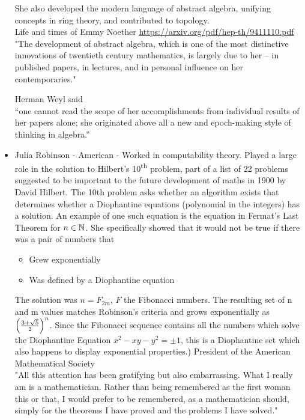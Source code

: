 \documentclass{article}
\begin{document}
\begin{itemize}
    She also developed the modern language of abstract algebra, unifying concepts in ring theory, and contributed to topology.  \\
    Life and times of Emmy Noether \url{https://arxiv.org/pdf/hep-th/9411110.pdf} \\
    \newline
    "The development of abstract algebra, which is one of the most distinctive innovations of twentieth century mathematics, is largely due to her – in published papers, in lectures, and in personal influence on her contemporaries."
    \newline
    
    Herman Weyl said \\
    \newline
    “one cannot read the scope of her accomplishments from individual results of her papers alone; she originated above all a new and epoch-making style of thinking in algebra.”
\newline
    
    
    \item Julia Robinson - American - Worked in computability theory. Played a large role in the solution to Hilbert's 10\textsuperscript{th} problem, part of a list of 22 problems suggested to be important to the future development of maths in 1900 by David Hilbert. The 10th problem asks whether an algorithm exists that determines whether a Diophantine equations (polynomial in the integers) has a solution. An example of one such equation is the equation in Fermat's Last Theorem
    for $n\in\mathbb{N}$. She specifically showed that it would not be true if there was a pair of numbers that 
    \begin{itemize}
        \item Grew exponentially
        \item Was defined by a Diophantine equation
    \end{itemize}
    The solution was $n=F_{2m}$, $F$ the Fibonacci numbers. The resulting set of n and m values matches Robinson’s criteria and grows exponentially as $\left( \frac{3+\sqrt{5}}{2} \right)^n$.  Since the Fibonacci sequence contains all the numbers which solve the Diophantine Equation $x^2 - xy - y^2 = \pm 1$, this is a Diophantine set which also happens to display exponential properties.) 
    President of the American Mathematical Society \\
    \newline
    "All this attention has been gratifying but also embarrassing. What I really am is a mathematician. Rather than being remembered as the first woman this or that, I would prefer to be remembered, as a mathematician should, simply for the theorems I have proved and the problems I have solved."
    \newline
    

\end{itemize}
\end{document}
